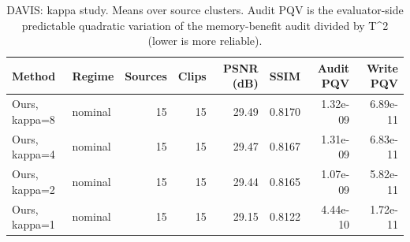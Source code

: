 \begin{table}[t]
\centering
\caption{DAVIS: kappa study. Means over source clusters. Audit PQV is the evaluator-side predictable quadratic variation of the memory-benefit audit divided by T^2 (lower is more reliable).}
\label{tab:kappa_DAVIS}
\small
\begin{tabular}{llrrrrrr}
\toprule
Method & Regime & Sources & Clips & PSNR (dB) & SSIM & Audit PQV & Write PQV \\
\midrule
Ours, kappa=8 & nominal & 15 & 15 & 29.49 & 0.8170 & 1.32e-09 & 6.89e-11 \\
Ours, kappa=4 & nominal & 15 & 15 & 29.47 & 0.8167 & 1.31e-09 & 6.83e-11 \\
Ours, kappa=2 & nominal & 15 & 15 & 29.44 & 0.8165 & 1.07e-09 & 5.82e-11 \\
Ours, kappa=1 & nominal & 15 & 15 & 29.15 & 0.8122 & 4.44e-10 & 1.72e-11 \\
\bottomrule
\end{tabular}
\end{table}
